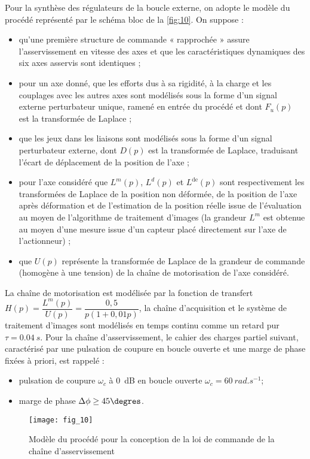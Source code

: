 Pour la synthèse des régulateurs de la boucle externe, on adopte le modèle du procédé représenté par le schéma
bloc de la \autoref{fig:10}. On suppose :
\begin{itemize}
\item qu’une première structure de commande « rapprochée » assure l’asservissement en vitesse des axes et que
les caractéristiques dynamiques des six axes asservis sont identiques ;
\item pour un axe donné, que les efforts dus à sa rigidité, à la charge et les couplages avec les autres axes sont modélisés sous la forme d’un signal externe perturbateur unique, ramené en entrée du procédé et dont  $F_u(p)$
est la transformée de Laplace ;
\item que les jeux dans les liaisons sont modélisés sous la forme d’un signal perturbateur externe, dont $D(p)$ est
la transformée de Laplace, traduisant l’écart de déplacement de la position de l’axe ;
\item pour l’axe considéré que $L^m(p)$, $L^d(p)$ et $L^{\text{de}}(p)$ sont respectivement les transformées de Laplace de la
position non déformée, de la position de l’axe après déformation et de l’estimation de la position réelle issue
de l’évaluation au moyen de l’algorithme de traitement d’images (la grandeur $L^m$  est obtenue au moyen
d’une mesure issue d’un capteur placé directement sur l’axe de l’actionneur) ;
\item que $U(p)$ représente la transformée de Laplace de la grandeur de commande (homogène à une tension) de
la chaîne de motorisation de l’axe considéré.
\end{itemize}
La chaîne de motorisation est modélisée par la fonction de transfert $H(p) = \dfrac{L^m(p)}{U(p)} = \dfrac{0,5}{p\left(1+0,01 p\right)}$, la chaîne
d’acquisition et le système de traitement d’images sont modélisés en temps continu comme un retard pur $\tau =\SI{0,04}{s}$. Pour la chaîne d’asservissement, le cahier des charges partiel suivant, caractérisé par une pulsation
de coupure en boucle ouverte et une marge de phase fixées à priori, est rappelé :
\begin{itemize}
\item pulsation de coupure $\omega_c$ à \SI{0}{dB} en boucle ouverte $\omega_c = \SI{60}{rad.s^{-1}}$;
\item marge de phase $\Delta \phi \geq 45 \degres$.
\end{itemize}

\begin{figure}[H]
\centering
\texttt{[image: fig\_10]}
\caption{\label{fig:10}  Modèle du procédé pour la conception de la loi de commande de la chaîne d’asservissement}
\end{figure}


